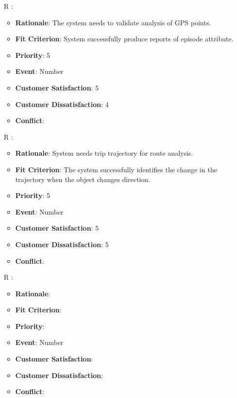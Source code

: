 \documentclass[12pt, titlepage]{article}
\newcounter{reqnum} %
\begin{document}
\begin{itemize}
\item[R\refstepcounter{reqnum}\thereqnum
\label{R_Inputs_1}:] 
\begin{itemize}
    \item \textbf{Rationale}: The system needs to validate  analysis of GPS points.
    \item \textbf{Fit Criterion}: System successfully produce reports of episode attribute.
    \item \textbf{Priority}: 5
    \item \textbf{Event}: Number
    \item \textbf{Customer Satisfaction}: 5
    \item \textbf{Customer Dissatisfaction}: 4
    \item \textbf{Conflict}:
\end{itemize}

\item[R\refstepcounter{reqnum}\thereqnum
\label{R_Inputs_1}:] 
\begin{itemize}
    \item \textbf{Rationale}: System needs trip trajectory for route analysis. 
    \item \textbf{Fit Criterion}: The system successfully identifies the change in the trajectory when the object changes direction. 
    \item \textbf{Priority}: 5
    \item \textbf{Event}: Number
    \item \textbf{Customer Satisfaction}: 5
    \item \textbf{Customer Dissatisfaction}: 5
    \item \textbf{Conflict}:
\end{itemize}

\item[R\refstepcounter{reqnum}\thereqnum
\label{R_Inputs_1}:] 
\begin{itemize}
    \item \textbf{Rationale}:
    \item \textbf{Fit Criterion}:
    \item \textbf{Priority}:
    \item \textbf{Event}: Number
    \item \textbf{Customer Satisfaction}:
    \item \textbf{Customer Dissatisfaction}:
    \item \textbf{Conflict}:
\end{itemize}


\end{itemize}
\end{document}
